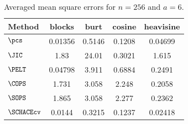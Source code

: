 \begin{table}[ht]
\centering
\begin{tabular}{lcccc}
  \hline
Method & blocks & burt & cosine & heavisine \\ 
  \hline
$\pcs$ & 0.01356 & 0.5146 & 0.1208 & 0.04699 \\ 
  $\JIC$ &  1.83 & 24.01 & 0.3021 & 1.615 \\ 
  $\PELT$ & 0.04798 & 3.911 & 0.6884 & 0.2491 \\ 
  $\COPS$ & 1.731 & 3.058 & 2.248 & 0.2058 \\ 
  $\SOPS$ & 1.865 & 3.058 & 2.277 & 0.2362 \\ 
  $\SCHACEcv$ & 0.0144 & 0.3215 & 0.1237 & 0.02418 \\ 
   \hline
\end{tabular}
\caption{Averaged mean square errors for $n = 256$ and $a = 6$.} 
\label{tab:aMSEn256a6}
\end{table}
